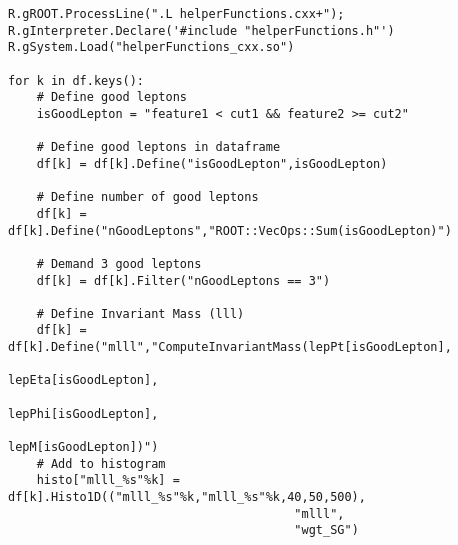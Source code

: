 \lstset{style=Python}
\begin{lstlisting}[caption={Python-file for calling dataframe and calculating $M_{lll}$.},captionpos=b, label={lst:df_mlll}]
R.gROOT.ProcessLine(".L helperFunctions.cxx+");
R.gInterpreter.Declare('#include "helperFunctions.h"') 
R.gSystem.Load("helperFunctions_cxx.so")

for k in df.keys():
    # Define good leptons
    isGoodLepton = "feature1 < cut1 && feature2 >= cut2"

    # Define good leptons in dataframe
    df[k] = df[k].Define("isGoodLepton",isGoodLepton)

    # Define number of good leptons
    df[k] = df[k].Define("nGoodLeptons","ROOT::VecOps::Sum(isGoodLepton)")

    # Demand 3 good leptons 
    df[k] = df[k].Filter("nGoodLeptons == 3")

    # Define Invariant Mass (lll)
    df[k] = df[k].Define("mlll","ComputeInvariantMass(lepPt[isGoodLepton], 
                                                        lepEta[isGoodLepton], 
                                                        lepPhi[isGoodLepton], 
                                                        lepM[isGoodLepton])")
    # Add to histogram
    histo["mlll_%s"%k] = df[k].Histo1D(("mlll_%s"%k,"mlll_%s"%k,40,50,500),
                                        "mlll",
                                        "wgt_SG")     
\end{lstlisting}

